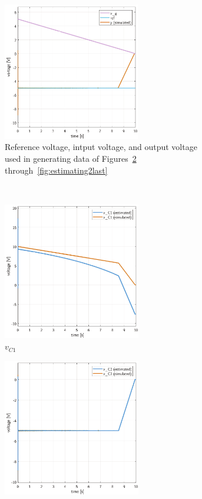 \begin{figure}[H]
    \begin{framed}
    \captionsetup[subfigure]{justification = centering}
    \centering
    \begin{subfigure}[b]{0.8\textwidth}
    \centering\includegraphics[height = 6cm]{figures/estimation/ref_y_ramp.pdf}
    \caption{Reference voltage, intput voltage, and output voltage used in generating data of Figures~\ref{fig:estimating2first} through~\ref{fig:estimating2last}}
    \label{}
    \end{subfigure}
    \\[11pt]
    \begin{subfigure}[b]{0.45\textwidth}
    \centering
    \includegraphics[height = 6cm]{figures/estimation/vC1_vC1b.pdf}
    \caption{$v_{C1}$}
    \label{fig:estimating2first}
    \end{subfigure}
    \hfill
    \begin{subfigure}[b]{0.45\textwidth}
    \centering
    \includegraphics[height = 6cm]{figures/estimation/vC2_vC2b.pdf}

\end{subfigure}
\end{framed}
\end{figure}
